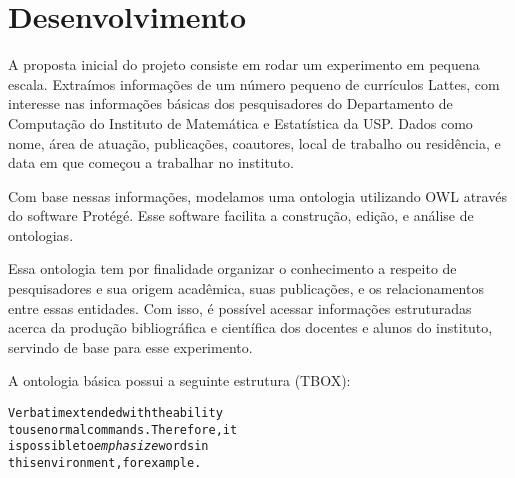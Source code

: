 \chapter{Desenvolvimento}
\label{cap:desenvolvimento}

A proposta inicial do projeto consiste em rodar um experimento em pequena escala. Extraímos informações de um número pequeno de currículos Lattes, com interesse nas informações básicas dos pesquisadores do Departamento de Computação do Instituto de Matemática e Estatística da USP. Dados como nome, área de atuação, publicações, coautores, local de trabalho ou residência, e data em que começou a trabalhar no instituto.

Com base nessas informações, modelamos uma ontologia utilizando OWL através do software Protégé. Esse software facilita a construção, edição, e análise de ontologias.

Essa ontologia tem por finalidade organizar o conhecimento a respeito de pesquisadores e sua origem acadêmica, suas publicações, e os relacionamentos entre essas entidades. Com isso, é possível acessar informações estruturadas acerca da produção bibliográfica e científica dos docentes e alunos do instituto, servindo de base para esse experimento.


A ontologia básica possui a seguinte estrutura (TBOX):


\begin{alltt}
Verbatim extended with the ability
to use normal commands.  Therefore, it
is possible to \emph{emphasize} words in
this environment, for example.
\end{alltt}

